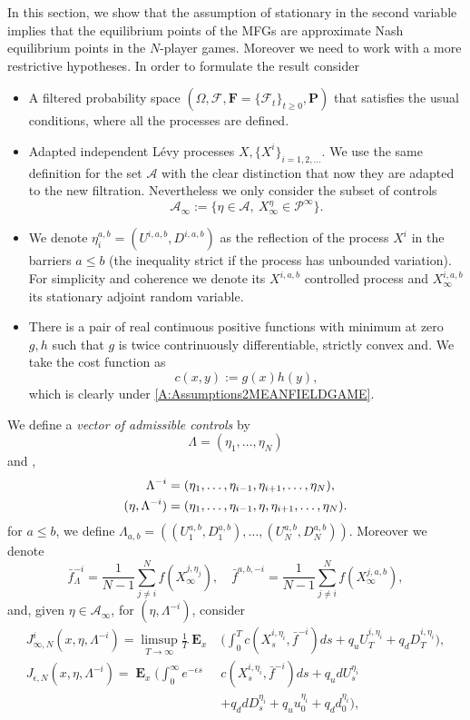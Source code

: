 \documentclass{article}
\newcommand\E{\operatorname{\mathbf{E}}}
\begin{document}
%
In this section, 
we show that the assumption of stationary in the second variable implies that the equilibrium points of the MFGs are approximate  Nash equilibrium points in the $N$-player games. 
Moreover we need to work with a more restrictive hypotheses.
%
In order to formulate the result consider
\begin{itemize}
\item[\rm(i)] A filtered probability space 
$(\Omega,\mathcal{F}, \mathbf{F}=  \lbrace \mathcal{F}_t\rbrace_{t \geq 0},\mathbf{P})$ 
that satisfies the usual conditions, where all the processes are defined.
\item[\rm(ii)] Adapted independent L\'evy processes  $X,\{X^i\}_{i=1,2,\dots}$. We use the same definition for the set $\mathcal{A}$ with the clear distinction that now they are adapted to the new filtration. Nevertheless we only consider the subset of controls 
$$\mathcal{A}_{\infty}:= \lbrace \eta \in \mathcal{A}, \ X_{\infty}^{\eta} \in \mathcal{P}^{\infty} \rbrace. $$  
%
%
\item[\rm(iii)]
We denote  $\eta_i^{a,b}=(U^{i,a,b},D^{i,a,b})$ as the reflection of the process $X^i$ in the barriers $a \leq b$ (the inequality strict if the process has unbounded variation).
For simplicity and coherence  we denote its $X^{i,a,b}$ controlled process and $X^{i,a,b}_{\infty}$ its stationary adjoint random variable.
\item[\rm(iv)] There is a pair of real continuous positive functions with minimum at zero $g,h$ such that $g$ is twice contrinuously differentiable, strictly convex and. We take the cost function as
$$ c(x,y):=g(x)h(y),$$
which is clearly under \ref{A:Assumptions2MEANFIELDGAME}.
%
%
\end{itemize}
%
We define a \emph{vector of admissible controls} by
$$
\Lambda=(\eta_1, \dots ,\eta_N)
$$ 
and ,
$$
\aligned
\Lambda^{-i}&=(\eta_1, \dots, \eta_{i-1}, \eta_{i+1}, \dots ,\eta_N
),\\
(\eta,\Lambda^{-i})&=(\eta_1, \dots, \eta_{i-1},\eta,\eta_{i+1}, \dots ,\eta_N).
\endaligned
$$ 
for $a \leq b$, we define $\Lambda_{a,b}=((U_1^{a,b},D^{a,b}_1),\dots ,(U_N^{a,b},D^{a,b}_N))$. Moreover we denote
\begin{equation}\label{E:nashLEVY}
\bar{f}^{-i}_{\Lambda}=\frac{1}{N-1}  \sum_{j \neq i}^N f( X_{\infty}^{j,\eta_j}),
\quad
\bar{f}^{a,b,-i}=\frac{1}{N-1}  \sum_{j \neq i}^N f( X_{\infty}^{j,a,b}),
\end{equation}
and, given $\eta\in\mathcal{A}_{\infty}$,
for $(\eta, \Lambda^{-i})$, consider
\begin{align}\label{eq:NCOSTLEVY}
J_{\infty,N}^{i}(x,\eta, \Lambda^{-i})= 
\limsup_{T \rightarrow \infty} \frac{1}{T} \E_x & 
\Bigg( \int_0^T c \left(X_s^{i,\eta_i},\bar{f}^{-i}\right)ds
+q_u U^{i,\eta_i}_T+q_d D^{i,\eta_i}_T \Bigg), \nonumber \\
J_{\epsilon,N}(x,\eta,\Lambda^{-i} )  =  \E_x \Bigg( \int_{0}^{\infty}e^{-\epsilon s} & c(X_s^{i,\eta_i},\bar{f}^{-i})ds   + q_udU^{\eta_i}_s  \\ &  +q_d dD^{\eta_i}_s  +q_uu_0^{\eta_i}+q_dd_0^{\eta_i}\bigg), \nonumber
\end{align}
\end{document}
